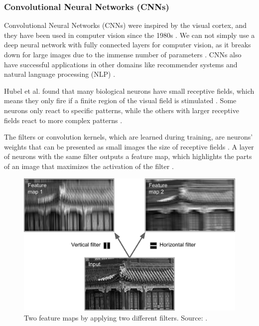 \documentclass[a4paper, 11pt, oneside]{article}
\begin{document}
\subsubsection{Convolutional Neural Networks (CNNs)}

\label{sec:cnn}

Convolutional Neural Networks (CNNs) \cite{lecun1989backpropagation} were inspired by the visual cortex, and they have
been used in computer vision since the 1980s \cite{geron2019hands}. We can not simply use a deep neural
network with fully connected layers for computer vision, as it breaks down for large images due to the immense
number of parameters \cite{geron2019hands}. CNNs also have successful applications in other domains like recommender
systems \cite{van2013deep} and natural language processing (NLP) \cite{collobert2008unified}.

Hubel et al. \cite{hubel1959single, hubel1959receptive, hubel1968receptive} found that many biological neurons have
small receptive fields, which means they only fire if a finite region of the visual field is stimulated
\cite{geron2019hands}. Some neurons only react to specific patterns, while the others with larger receptive fields
react to more complex patterns \cite{geron2019hands}.

The filters or convolution kernels, which are learned during training, are neurons' weights that can be presented as
small images the size of receptive fields \cite{geron2019hands}. A layer of neurons with the same filter outputs a
feature map, which highlights the parts of an image that maximizes the activation of the filter \cite{geron2019hands}.

\begin{figure}[ht]
  \begin{center}
    \includegraphics[width=.6\textwidth]{filters.png}
  \end{center}
  \caption{Two feature maps by applying two different filters. Source: \cite{geron2019hands}.}
\end{figure}
\end{document}
